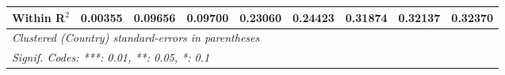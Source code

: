 \begin{table}[htbp]
\begin{tabular}{lcccccccc}
      Within R$^2$                                                                      & 0.00355  & 0.09656  & 0.09700  & 0.23060      & 0.24423       & 0.31874       & 0.32137       & 0.32370\\  
      \midrule \midrule
      \multicolumn{9}{l}{\emph{Clustered (Country) standard-errors in parentheses}}\\
      \multicolumn{9}{l}{\emph{Signif. Codes: ***: 0.01, **: 0.05, *: 0.1}}\\
   \end{tabular}
\end{table}


